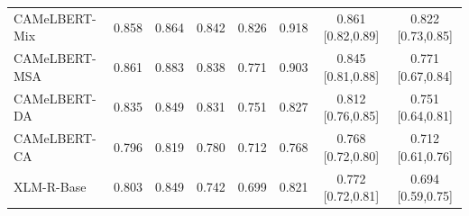 \begin{tabular}{lccccccc}
CAMeLBERT-Mix & 0.858 & 0.864 & 0.842 & 0.826 & 0.918 & 0.861 {\scriptsize[0.82,0.89]} & 0.822 {\scriptsize[0.73,0.85]} \\
CAMeLBERT-MSA & 0.861 & 0.883 & 0.838 & 0.771 & 0.903 & 0.845 {\scriptsize[0.81,0.88]} & 0.771 {\scriptsize[0.67,0.84]} \\
CAMeLBERT-DA & 0.835 & 0.849 & 0.831 & 0.751 & 0.827 & 0.812 {\scriptsize[0.76,0.85]} & 0.751 {\scriptsize[0.64,0.81]} \\
CAMeLBERT-CA & 0.796 & 0.819 & 0.780 & 0.712 & 0.768 & 0.768 {\scriptsize[0.72,0.80]} & 0.712 {\scriptsize[0.61,0.76]} \\
XLM-R-Base & 0.803 & 0.849 & 0.742 & 0.699 & 0.821 & 0.772 {\scriptsize[0.72,0.81]} & 0.694 {\scriptsize[0.59,0.75]} \\
\bottomrule
\end{tabular}
